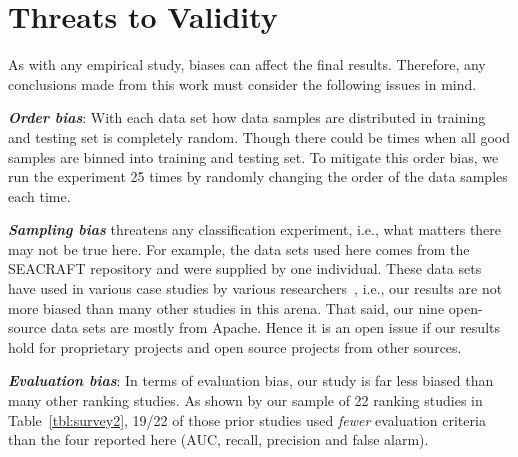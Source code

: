 \documentclass[sigconf]{acmart}
\theoremstyle{break}
\begin{document}
\section{Threats to Validity}
\label{sect:validity}

As with any empirical study, biases can affect the final
results. Therefore, any conclusions made from this work must consider the following issues in mind.

\textbf{\textit{Order bias}}: With each data set how data samples are distributed in training and testing set is completely random. Though there could be times when all good samples are binned into training and testing set. To mitigate this order bias, we run
the experiment 25 times by randomly changing the order of the data samples each time.

\textbf{\textit{Sampling bias}} threatens any classification experiment, i.e., what matters there may not be true here. For example, the data sets used here comes from the SEACRAFT repository and were supplied by one individual. These data sets have used in various case studies by various researchers~\cite{he2012investigation,peters2013better,peters2013balancing,turhan2013empirical}, i.e., our results are not more biased than many other studies in this arena.
That said, our nine open-source data sets   are mostly from Apache. Hence
it is an open issue if our results hold for
 proprietary projects and open source projects from other sources.


\textbf{\textit{Evaluation bias}}: In terms of evaluation bias,
our study is far less biased than many other ranking studies.  As shown by our sample of
22 ranking studies in
Table~\ref{tbl:survey2}, 19/22 of those prior studies used {\em fewer} evaluation criteria
than the four reported here (AUC, recall, precision and false alarm). 
\end{document}
